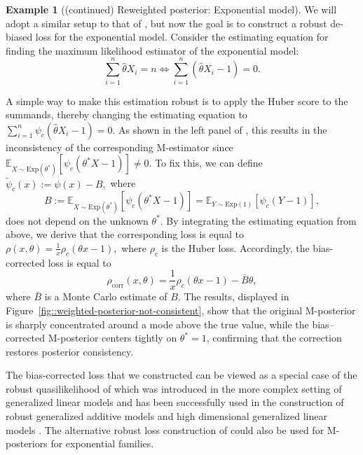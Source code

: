 \documentclass[11pt, oneside]{amsart}
\theoremstyle{definition}   %
\newtheorem{example}{Example}
\newcommand{\E}{\mathbb{E}}
\begin{document}
\begin{example}[(continued) Reweighted posterior: Exponential model] 

We will adopt a similar setup to that of , but now the goal is to construct a robust de-biased loss for the exponential model. 
 Consider the estimating equation for finding the maximum likelihood estimator of the exponential model:
%
\[
    \sum_{i=1}^n \hat\theta X_i = n  \Longleftrightarrow  \sum_{i=1}^n (\hat\theta X_i - 1) = 0.
\]

A simple way to make this estimation robust is to apply the Huber score to the summands, thereby changing the estimating equation to
%
\( 
    \sum_{i=1}^n \psi_c (\hat\theta X_i - 1) = 0.
\)
%
As shown in the left panel of , this results in the inconsistency of the corresponding M-estimator since \( \E_{X \sim \text{Exp}(\theta^*)}[\psi_c( \theta^* X - 1 )] \neq 0\).  To fix this, we can define
%
\(
    \widetilde \psi_c(x) := \psi(x) - B,
\)
%
where 
\[
    B := \E_{X \sim \text{Exp}(\theta^*)}[\psi_c( \theta^* X - 1 )] = \E_{Y \sim \text{Exp}(1)}[\psi_c( Y - 1 )],
\]
does not depend on the unknown \( \theta^* \).  By integrating the estimating equation from above, we derive that the corresponding loss is equal to
%
\(
    \rho(x, \theta) = \frac{1}{x} \rho_c (\theta x - 1),
\)
%
where \( \rho_c \) is the Huber loss.  Accordingly, the bias-corrected loss is equal to
%
\[
    \rho_{\text{corr}}(x, \theta) = \frac{1}{x} \rho_c (\theta x - 1) - \bar B \theta,
\]
where \( \bar B\) is a Monte Carlo estimate of \( B\).
The results, displayed in Figure~\ref{fig::weighted-posterior-not-consistent}, show that the original M-posterior is sharply concentrated around a mode above the true value, while the bias–corrected M-posterior centers tightly on \(\theta^* = 1\), confirming that the correction restores posterior consistency.
%

The bias-corrected loss that we constructed can be viewed as a special case of the robust quasilikelihood of \cite{cantoni:ronchetti2001} which was introduced in the more complex setting of generalized linear models and has been successfully used in the construction of robust generalized additive models \citep{alimadad:salibian-barrera2011,croux:gijbels:prosdocimi2012} and high dimensional generalized linear models \citep{avellamedina:ronchetti2018}. The alternative robust loss construction of \cite{bianco:yohai1996,bianco:boente:rodriguez2013} could also be used for M-posteriors  for exponential families.



\end{example}
\end{document}
